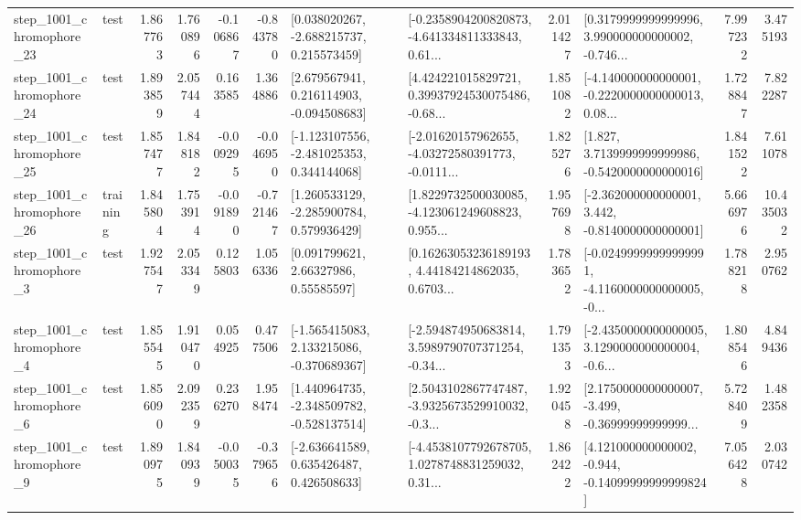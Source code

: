 \begin{tabular}{llrrrrllrlrr}
 step\_1001\_chromophore\_23 &      test &      1.867763 &    1.760896 &     -0.106867 & -0.843780 &    [0.038020267, -2.688215737, 0.215573459] &  [-0.2358904200820873, -4.641334811333843, 0.61... &       2.011427 &  [0.3179999999999996, 3.990000000000002, -0.746... &            7.997232 &          3.475193 \\
 step\_1001\_chromophore\_24 &      test &      1.893859 &    2.057444 &      0.163585 &  1.364886 &    [2.679567941, 0.216114903, -0.094508683] &  [4.424221015829721, 0.39937924530075486, -0.68... &       1.851082 &  [-4.140000000000001, -0.2220000000000013, 0.08... &            1.728847 &          7.822287 \\
 step\_1001\_chromophore\_25 &      test &      1.857477 &    1.848182 &     -0.009295 & -0.046950 &   [-1.123107556, -2.481025353, 0.344144068] &  [-2.01620157962655, -4.03272580391773, -0.0111... &       1.825276 &   [1.827, 3.7139999999999986, -0.5420000000000016] &            1.841522 &          7.611078 \\
 step\_1001\_chromophore\_26 &  training &      1.845804 &    1.753914 &     -0.091890 & -0.721467 &    [1.260533129, -2.285900784, 0.579936429] &  [1.8229732500030085, -4.123061249608823, 0.955... &       1.957698 &   [-2.362000000000001, 3.442, -0.8140000000000001] &            5.666976 &         10.435032 \\
  step\_1001\_chromophore\_3 &      test &      1.927547 &    2.053349 &      0.125803 &  1.056336 &       [0.091799621, 2.66327986, 0.55585597] &  [0.16263053236189193, 4.44184214862035, 0.6703... &       1.783652 &  [-0.02499999999999991, -4.1160000000000005, -0... &            1.788218 &          2.950762 \\
  step\_1001\_chromophore\_4 &      test &      1.855545 &    1.910470 &      0.054925 &  0.477506 &   [-1.565415083, 2.133215086, -0.370689367] &  [-2.594874950683814, 3.5989790707371254, -0.34... &       1.791353 &  [-2.4350000000000005, 3.1290000000000004, -0.6... &            1.808546 &          4.849436 \\
  step\_1001\_chromophore\_6 &      test &      1.856090 &    2.092359 &      0.236270 &  1.958474 &   [1.440964735, -2.348509782, -0.528137514] &  [2.5043102867747487, -3.9325673529910032, -0.3... &       1.920458 &  [2.1750000000000007, -3.499, -0.36999999999999... &            5.728409 &          1.482358 \\
  step\_1001\_chromophore\_9 &      test &      1.890975 &    1.840939 &     -0.050035 & -0.379656 &    [-2.636641589, 0.635426487, 0.426508633] &  [-4.4538107792678705, 1.0278748831259032, 0.31... &       1.862422 &  [4.121000000000002, -0.944, -0.14099999999999824] &            7.056428 &          2.030742 \\

\end{tabular}
